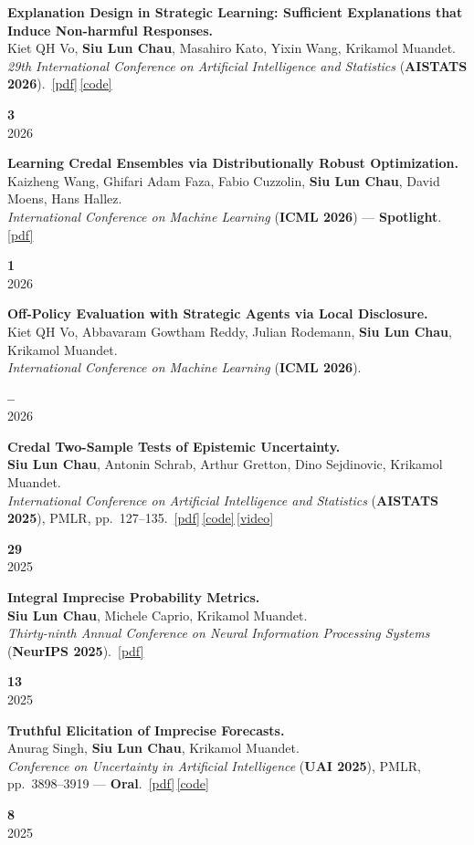 \documentclass[11pt,a4paper]{article}
\newcommand{\me}{\textbf{Siu Lun Chau}}
\newcommand{\acro}[1]{\textcolor{accent}{\textbf{#1}}}
\newcommand{\award}[1]{\textcolor{award}{\textbf{#1}}}
\newcommand{\venue}[2]{\textit{#1} (\acro{#2})}
\newcommand{\pdfb}[1]{\,\href{#1}{\textcolor{accent}{\small[pdf]}}}
\newcommand{\codeb}[1]{\,\href{#1}{\textcolor{accent}{\small[code]}}}
\newcommand{\videob}[1]{\,\href{#1}{\textcolor{accent}{\small[video]}}}
\newlength{\citecolwidth}\setlength{\citecolwidth}{2.4cm}
\newlength{\indexcolwidth}\setlength{\indexcolwidth}{3.2em}
\newcommand{\citebox}[2]{%
  {\color{citecol}\textbf{\large #1}}\\[1pt]
  {\color{mutedgrey}\small #2}%
}
\newcommand{\pubentry}[4]{%
  \noindent
  \makebox[\indexcolwidth][l]{\textbf{[#1]}}%
  \begin{minipage}[t]{\dimexpr\linewidth-\indexcolwidth-\citecolwidth-0.4em\relax}#2\end{minipage}%
  \hspace{0.4em}%
  \begin{minipage}[t]{\citecolwidth}\raggedleft\citebox{#3}{#4}\end{minipage}%
  \par\vspace{6pt}}
\begin{document}
\pubentry{C2}{%
\textbf{Explanation Design in Strategic Learning: Sufficient Explanations that Induce Non-harmful Responses.}\\
Kiet QH Vo, \me, Masahiro Kato, Yixin Wang, Krikamol Muandet.\\
\venue{29th International Conference on Artificial Intelligence and Statistics}{AISTATS 2026}.%
\pdfb{https://arxiv.org/pdf/2502.04058}\codeb{https://github.com/muandet-lab/sl-leaf}%
}{3}{2026}

\pubentry{C3}{%
\textbf{Learning Credal Ensembles via Distributionally Robust Optimization.}\\
Kaizheng Wang, Ghifari Adam Faza, Fabio Cuzzolin, \me, David Moens, Hans Hallez.\\
\venue{International Conference on Machine Learning}{ICML 2026} --- \award{Spotlight}.%
\pdfb{https://arxiv.org/pdf/2602.08470}%
}{1}{2026}

\pubentry{C4}{%
\textbf{Off-Policy Evaluation with Strategic Agents via Local Disclosure.}\\
Kiet QH Vo, Abbavaram Gowtham Reddy, Julian Rodemann, \me, Krikamol Muandet.\\
\venue{International Conference on Machine Learning}{ICML 2026}.%
}{--}{2026}

\pubentry{C5}{%
\textbf{Credal Two-Sample Tests of Epistemic Uncertainty.}\\
\me, Antonin Schrab, Arthur Gretton, Dino Sejdinovic, Krikamol Muandet.\\
\venue{International Conference on Artificial Intelligence and Statistics}{AISTATS 2025}, PMLR, pp.~127--135.%
\pdfb{https://arxiv.org/pdf/2410.12921}\codeb{https://github.com/muandet-lab/CredalTwoSampleTests}\videob{https://www.youtube.com/watch?v=Rq9qW0GZJeE}%
}{29}{2025}

\pubentry{C6}{%
\textbf{Integral Imprecise Probability Metrics.}\\
\me, Michele Caprio, Krikamol Muandet.\\
\venue{Thirty-ninth Annual Conference on Neural Information Processing Systems}{NeurIPS 2025}.%
\pdfb{https://arxiv.org/pdf/2505.16156}%
}{13}{2025}

\pubentry{C7}{%
\textbf{Truthful Elicitation of Imprecise Forecasts.}\\
Anurag Singh, \me, Krikamol Muandet.\\
\venue{Conference on Uncertainty in Artificial Intelligence}{UAI 2025}, PMLR, pp.~3898--3919 --- \award{Oral}.%
\pdfb{http://arxiv.org/pdf/2503.16395}\codeb{https://github.com/muandet-lab/Imprecise-Scoring-Rule}%
}{8}{2025}
\end{document}
